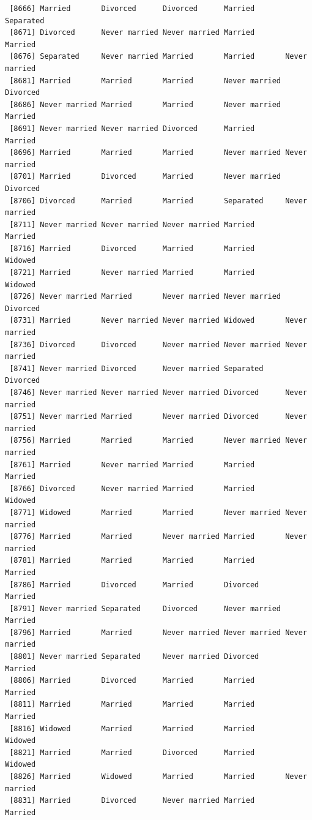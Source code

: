 \documentclass[
  letterpaper,
  DIV=11,
  numbers=noendperiod,
  oneside]{scrartcl}
\begin{document}
\begin{verbatim}
 [8666] Married       Divorced      Divorced      Married       Separated    
 [8671] Divorced      Never married Never married Married       Married      
 [8676] Separated     Never married Married       Married       Never married
 [8681] Married       Married       Married       Never married Divorced     
 [8686] Never married Married       Married       Never married Married      
 [8691] Never married Never married Divorced      Married       Married      
 [8696] Married       Married       Married       Never married Never married
 [8701] Married       Divorced      Married       Never married Divorced     
 [8706] Divorced      Married       Married       Separated     Never married
 [8711] Never married Never married Never married Married       Married      
 [8716] Married       Divorced      Married       Married       Widowed      
 [8721] Married       Never married Married       Married       Widowed      
 [8726] Never married Married       Never married Never married Divorced     
 [8731] Married       Never married Never married Widowed       Never married
 [8736] Divorced      Divorced      Never married Never married Never married
 [8741] Never married Divorced      Never married Separated     Divorced     
 [8746] Never married Never married Never married Divorced      Never married
 [8751] Never married Married       Never married Divorced      Never married
 [8756] Married       Married       Married       Never married Never married
 [8761] Married       Never married Married       Married       Married      
 [8766] Divorced      Never married Married       Married       Widowed      
 [8771] Widowed       Married       Married       Never married Never married
 [8776] Married       Married       Never married Married       Never married
 [8781] Married       Married       Married       Married       Married      
 [8786] Married       Divorced      Married       Divorced      Married      
 [8791] Never married Separated     Divorced      Never married Married      
 [8796] Married       Married       Never married Never married Never married
 [8801] Never married Separated     Never married Divorced      Married      
 [8806] Married       Divorced      Married       Married       Married      
 [8811] Married       Married       Married       Married       Married      
 [8816] Widowed       Married       Married       Married       Widowed      
 [8821] Married       Married       Divorced      Married       Widowed      
 [8826] Married       Widowed       Married       Married       Never married
 [8831] Married       Divorced      Never married Married       Married      

\end{verbatim}
\end{document}
